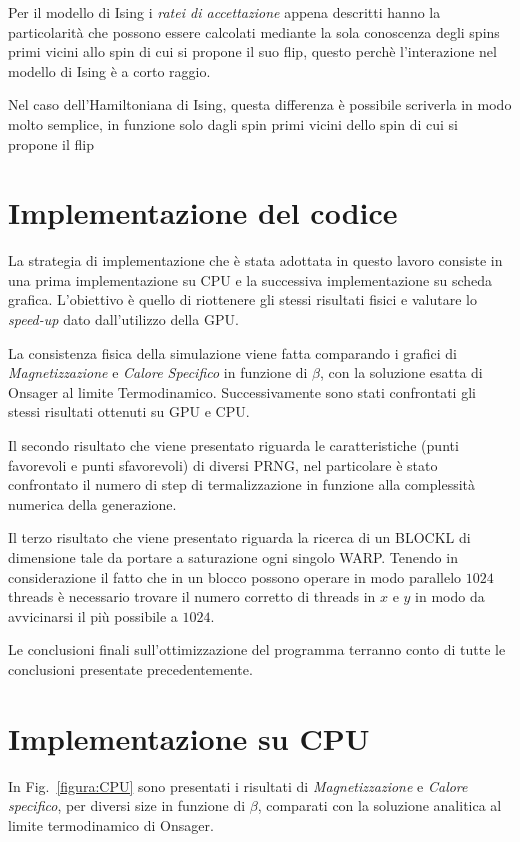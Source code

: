 \documentclass[a4paper,12pt]{article}
\begin{document}
Per il modello di Ising i \emph{ratei di accettazione} appena descritti hanno la particolarit\`a che possono essere calcolati mediante la sola conoscenza degli spins primi vicini allo spin di cui si propone il suo flip, questo perchè l'interazione nel modello di Ising  è a corto raggio. 

Nel caso dell'Hamiltoniana di Ising, questa differenza è possibile scriverla in modo molto semplice, in funzione solo dagli spin primi vicini dello spin di cui si propone il flip



\section{Implementazione del codice}
La strategia di implementazione che \`e stata adottata in questo lavoro consiste in una prima implementazione su CPU e la successiva implementazione su scheda grafica. L'obiettivo \`e quello di riottenere gli stessi risultati fisici e valutare lo \emph{speed-up} dato dall'utilizzo della GPU. 

La consistenza fisica della simulazione viene fatta comparando i grafici di \emph{Magnetizzazione} e \emph{Calore Specifico} in funzione di $\beta$, con la soluzione esatta di Onsager al limite Termodinamico. Successivamente sono stati confrontati gli stessi risultati ottenuti su GPU e CPU. 

Il secondo risultato che viene presentato riguarda le caratteristiche (punti favorevoli e punti sfavorevoli) di diversi PRNG, nel particolare \`e stato confrontato il numero di step di termalizzazione in funzione alla complessit\`a numerica della generazione. 

Il terzo risultato che viene presentato riguarda la ricerca di un BLOCKL di dimensione tale da portare a saturazione ogni singolo WARP. Tenendo in considerazione il fatto che in un blocco possono operare in modo parallelo $1024$ threads \`e necessario trovare il numero corretto di threads in $x$ e $y$ in modo da avvicinarsi il pi\`u possibile a $1024$.

Le conclusioni finali sull'ottimizzazione del programma terranno conto di tutte le conclusioni presentate precedentemente.

\section{Implementazione su CPU}
In Fig.~\ref{figura:CPU} sono presentati i risultati di \emph{Magnetizzazione} e \emph{Calore specifico}, per diversi size in funzione di $\beta$, comparati con la soluzione analitica al limite termodinamico di Onsager.
\end{document}
